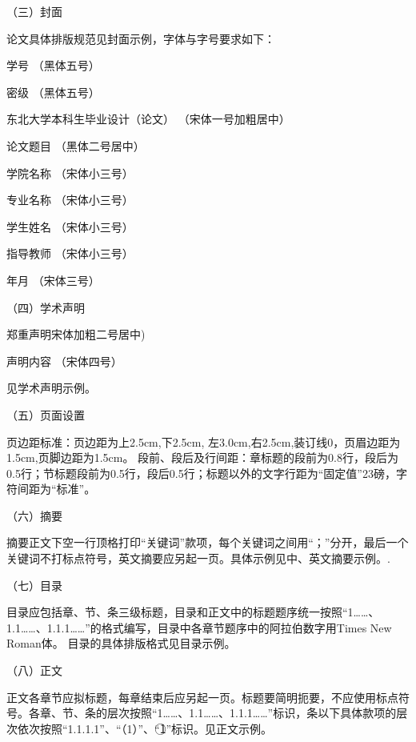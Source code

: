 （三）封面

论文具体排版规范见封面示例，字体与字号要求如下：

学号 \hspace{7cm} （黑体五号）

密级 \hspace{7cm} （黑体五号）

东北大学本科生毕业设计（论文）\hspace{2cm} （宋体一号加粗居中）

论文题目 \hspace{7cm} （黑体二号居中）

学院名称 \hspace{7cm} （宋体小三号）

专业名称 \hspace{7cm} （宋体小三号）

学生姓名 \hspace{7cm} （宋体小三号）

指导教师 \hspace{7cm} （宋体小三号）

年\hspace{1cm}月 \hspace{7cm}  （宋体三号）

（四）学术声明

郑重声明\hspace{7cm}宋体加粗二号居中)

声明内容 \hspace{7cm}（宋体四号）

见学术声明示例。

（五）页面设置

页边距标准：页边距为上2.5cm,下2.5cm, 左3.0cm,右2.5cm,装订线0，页眉边距为1.5cm,页脚边距为1.5cm。
段前、段后及行间距：章标题的段前为0.8行，段后为0.5行；节标题段前为0.5行，段后0.5行；标题以外的文字行距为“固定值”23磅，字符间距为“标准”。

（六）摘要

摘要正文下空一行顶格打印“关键词”款项，每个关键词之间用“；”分开，最后一个关键词不打标点符号，英文摘要应另起一页。具体示例见中、英文摘要示例。.

（七）目录

目录应包括章、节、条三级标题，目录和正文中的标题题序统一按照“1……、1.1……、1.1.1……”的格式编写，目录中各章节题序中的阿拉伯数字用Times New Roman体。
目录的具体排版格式见目录示例。

（八）正文

正文各章节应拟标题，每章结束后应另起一页。标题要简明扼要，不应使用标点符号。各章、节、条的层次按照“1……、1.1……、1.1.1……”标识，条以下具体款项的层次依次按照“1.1.1.1”、“（1）”、“\textcircled{1}”标识。见正文示例。

